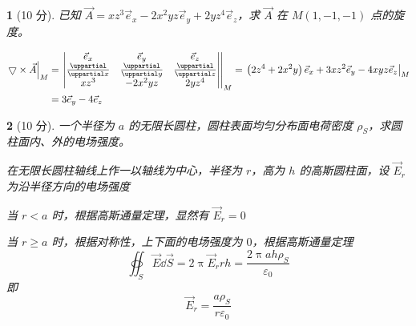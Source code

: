 \documentclass{book}
\theoremstyle{change}
\newtheorem{ti}{}[section]
\def\partial{\uppartial}
\begin{document}
\begin{ti}[10 分]
	已知 $\vec{A}=xz^3\vec{e}_x-2x^2yz\vec{e}_y+2yz^4\vec{e}_z$，求 $\vec{A}$ 在 $M(1,-1,-1)$ 点的旋度。
	\begin{solution}
		\begin{align*}
			\left.\bigtriangledown\times\vec{A}\right|_M &= \left.
			\begin{vmatrix}
			\vec{e}_x & \vec{e}_y & \vec{e}_z\\
			\frac{\partial}{\partial x} & \frac{\partial}{\partial y} & \frac{\partial}{\partial z}\\
			xz^3 & -2x^2yz & 2yz^4
			\end{vmatrix}\right|_M
			=\left.\left(2z^4+2x^2y\right)\vec{e}_x+3xz^2\vec{e}_y-4xyz\vec{e}_z\right|_M\\
			&= 3\vec{e}_y-4\vec{e}_z
		\end{align*}
	\end{solution}
\end{ti}

\begin{ti}[10 分]
	一个半径为 $a$ 的无限长圆柱，圆柱表面均匀分布面电荷密度 $\rho_S$，求圆柱面内、外的电场强度。
	\begin{solution}
		在无限长圆柱轴线上作一以轴线为中心，半径为 $r$，高为 $h$ 的高斯圆柱面，设 $\vec{E}_r$ 为沿半径方向的电场强度
		
		当 $r<a$ 时，根据高斯通量定理，显然有 $\vec{E}_r=0$
		
		当 $r\geqslant a$ 时，根据对称性，上下面的电场强度为 $0$，根据高斯通量定理
		\[
			\oiint_{S}\vec{E}\dd \vec{S}=2\uppi\vec{E}_rrh=\frac{2\uppi ah\rho_S}{\varepsilon_0}
		\]
		即
		\[
			\vec{E}_r=\frac{a\rho_S}{r\varepsilon_0}
		\]
	\end{solution}
\end{ti}
\end{document}
